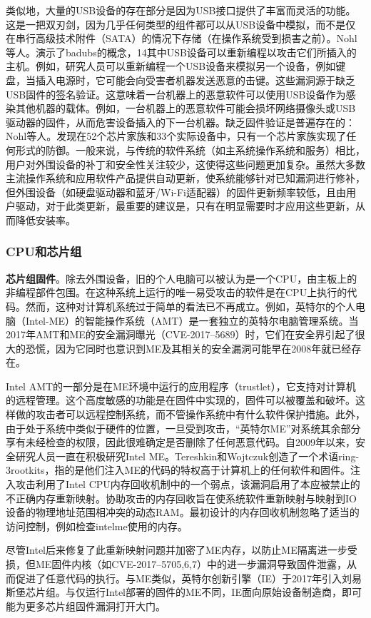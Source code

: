 类似地，大量的USB设备的存在部分是因为USB接口提供了丰富而灵活的功能。这是一把双刃剑，因为几乎任何类型的组件都可以从USB设备中模拟，而不是仅在串行高级技术附件（SATA）的情况下存储（在操作系统受到损害之前）。Nohl等人。演示了badubs的概念，14其中USB设备可以重新编程以攻击它们所插入的主机。例如，研究人员可以重新编程一个USB设备来模拟另一个设备，例如键盘，当插入电源时，它可能会向受害者机器发送恶意的击键。这些漏洞源于缺乏USB固件的签名验证。这意味着一台机器上的恶意软件可以使用USB设备作为感染其他机器的载体。例如，一台机器上的恶意软件可能会损坏网络摄像头或USB驱动器的固件，从而危害设备插入的下一台机器。缺乏固件验证是普遍存在的：Nohl等人。发现在52个芯片家族和33个实际设备中，只有一个芯片家族实现了任何形式的防御。一般来说，与传统的软件系统（如主系统操作系统和服务）相比，用户对外围设备的补丁和安全性关注较少，这使得这些问题更加复杂。虽然大多数主流操作系统和应用软件产品提供自动更新，使系统能够针对已知漏洞进行修补，但外围设备（如硬盘驱动器和蓝牙/Wi-Fi适配器）的固件更新频率较低，且由用户驱动，对于此类更新，最重要的建议是，只有在明显需要时才应用这些更新，从而降低安装率。

\subsubsection{CPU和芯片组}

\textbf{芯片组固件}。除去外围设备，旧的个人电脑可以被认为是一个CPU，由主板上的非编程部件包围。在这种系统上运行的唯一易受攻击的软件是在CPU上执行的代码。然而，这种对计算机系统过于简单的看法已不再成立。例如，英特尔的个人电脑（Intel-ME）的智能操作系统（AMT）是一套独立的英特尔电脑管理系统。当2017年AMT和ME的安全漏洞曝光（CVE-2017–5689）时，它们在安全界引起了很大的恐慌，因为它同时也意识到ME及其相关的安全漏洞可能早在2008年就已经存在。

Intel AMT的一部分是在ME环境中运行的应用程序（trustlet），它支持对计算机的远程管理。这个高度敏感的功能是在固件中实现的，固件可以被覆盖和破坏。这样做的攻击者可以远程控制系统，而不管操作系统中有什么软件保护措施。此外，由于处于系统中类似于硬件的位置，一旦受到攻击，“英特尔ME”对系统其余部分享有未经检查的权限，因此很难确定是否删除了任何恶意代码。自2009年以来，安全研究人员一直在积极研究Intel ME。Tereshkin和Wojtczuk创造了一个术语ring-3rootkits，指的是他们注入ME的代码的特权高于计算机上的任何软件和固件。注入攻击利用了Intel CPU内存回收机制中的一个弱点，该漏洞启用了本应被禁止的不正确内存重新映射。协助攻击的内存回收旨在使系统软件重新映射与映射到IO设备的物理地址范围相冲突的动态RAM。最初设计的内存回收机制忽略了适当的访问控制，例如检查intelme使用的内存。

尽管Intel后来修复了此重新映射问题并加密了ME内存，以防止ME隔离进一步受损，但ME固件内核（如CVE-2017–5705,6,7）中的进一步漏洞导致固件泄露，从而促进了任意代码的执行。与ME类似，英特尔创新引擎（IE）于2017年引入刘易斯堡芯片组。与仅运行Intel部署的固件的ME不同，IE面向原始设备制造商，即可能为更多芯片组固件漏洞打开大门。

